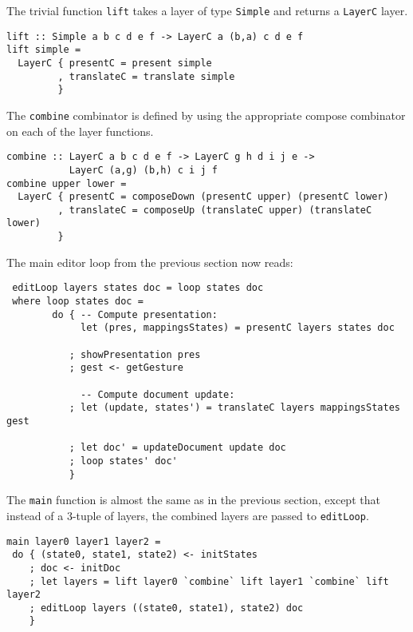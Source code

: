 The trivial function \texttt{lift} takes a layer of type \texttt{Simple} and returns a \texttt{LayerC} layer.

\begin{small}
\begin{verbatim}
lift :: Simple a b c d e f -> LayerC a (b,a) c d e f
lift simple = 
  LayerC { presentC = present simple
         , translateC = translate simple
         }
\end{verbatim}
\end{small}

The \texttt{combine} combinator is defined by using the appropriate compose combinator on each of the layer functions. 

\begin{small}
\begin{verbatim}
combine :: LayerC a b c d e f -> LayerC g h d i j e -> 
           LayerC (a,g) (b,h) c i j f
combine upper lower =
  LayerC { presentC = composeDown (presentC upper) (presentC lower)
         , translateC = composeUp (translateC upper) (translateC lower)
         }
\end{verbatim}
\end{small}


 The main editor loop from the previous section now reads:
 
 \begin{small}
 \begin{verbatim}
 editLoop layers states doc = loop states doc
 where loop states doc = 
        do { -- Compute presentation:
             let (pres, mappingsStates) = presentC layers states doc
           
           ; showPresentation pres
           ; gest <- getGesture
 
             -- Compute document update:
           ; let (update, states') = translateC layers mappingsStates gest
       
           ; let doc' = updateDocument update doc
           ; loop states' doc'
           }
\end{verbatim}
\end{small}

The \texttt{main} function is almost the same as in the previous section, except that instead of a 3-tuple of layers, the combined layers are passed to \texttt{editLoop}. 

\begin{small}
\begin{verbatim}
main layer0 layer1 layer2 = 
 do { (state0, state1, state2) <- initStates
    ; doc <- initDoc 
    ; let layers = lift layer0 `combine` lift layer1 `combine` lift  layer2
    ; editLoop layers ((state0, state1), state2) doc
    }
\end{verbatim}
\end{small}


